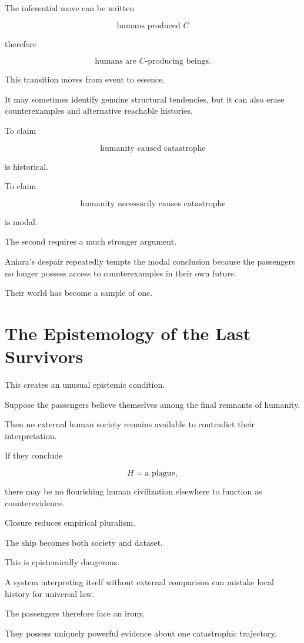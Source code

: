 \documentclass[11pt,oneside]{book}
\theoremstyle{definition}
\theoremstyle{remark}
\begin{document}
The inferential move can be written

\[
\text{humans produced }C
\]

therefore

\[
\text{humans are }C\text{-producing beings}.
\]

This transition moves from event to essence.

It may sometimes identify genuine structural tendencies, but it can also erase counterexamples and alternative reachable histories.

To claim

\[
\text{humanity caused catastrophe}
\]

is historical.

To claim

\[
\text{humanity necessarily causes catastrophe}
\]

is modal.

The second requires a much stronger argument.

Aniara's despair repeatedly tempts the modal conclusion because the passengers no longer possess access to counterexamples in their own future.

Their world has become a sample of one.

\section{The Epistemology of the Last Survivors}

This creates an unusual epistemic condition.

Suppose the passengers believe themselves among the final remnants of humanity.

Then no external human society remains available to contradict their interpretation.

If they conclude

\[
H=\text{a plague},
\]

there may be no flourishing human civilization elsewhere to function as counterevidence.

Closure reduces empirical pluralism.

The ship becomes both society and dataset.

This is epistemically dangerous.

A system interpreting itself without external comparison can mistake local history for universal law.

The passengers therefore face an irony.

They possess uniquely powerful evidence about one catastrophic trajectory.
\end{document}
